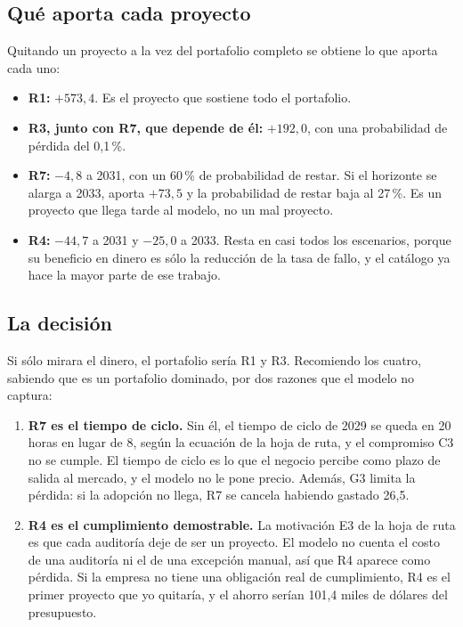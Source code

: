 \documentclass[11pt,letterpaper]{article}
\newcommand{\pct}{\,\%}
\begin{document}
\subsection*{Qué aporta cada proyecto}

Quitando un proyecto a la vez del portafolio completo se obtiene lo que aporta
cada uno:

\begin{itemize}
\item \textbf{R1:} $+573{,}4$. Es el proyecto que sostiene todo el portafolio.
\item \textbf{R3, junto con R7, que depende de él:} $+192{,}0$, con una
  probabilidad de pérdida del 0,1\pct.
\item \textbf{R7:} $-4{,}8$ a 2031, con un 60\pct{} de probabilidad de restar.
  Si el horizonte se alarga a 2033, aporta $+73{,}5$ y la probabilidad de
  restar baja al 27\pct. Es un proyecto que llega tarde al modelo, no un mal
  proyecto.
\item \textbf{R4:} $-44{,}7$ a 2031 y $-25{,}0$ a 2033. Resta en casi todos los
  escenarios, porque su beneficio en dinero es sólo la reducción de la tasa de
  fallo, y el catálogo ya hace la mayor parte de ese trabajo.
\end{itemize}

\subsection*{La decisión}

Si sólo mirara el dinero, el portafolio sería R1 y R3. Recomiendo los cuatro,
sabiendo que es un portafolio dominado, por dos razones que el modelo no
captura:

\begin{enumerate}
\item \textbf{R7 es el tiempo de ciclo.} Sin él, el tiempo de ciclo de 2029 se
  queda en 20 horas en lugar de 8, según la ecuación de la hoja de ruta, y el
  compromiso C3 no se cumple. El tiempo de ciclo es lo que el negocio percibe
  como plazo de salida al mercado, y el modelo no le pone precio. Además, G3
  limita la pérdida: si la adopción no llega, R7 se cancela habiendo gastado
  26,5.
\item \textbf{R4 es el cumplimiento demostrable.} La motivación E3 de la hoja de
  ruta es que cada auditoría deje de ser un proyecto. El modelo no cuenta el
  costo de una auditoría ni el de una excepción manual, así que R4 aparece como
  pérdida. Si la empresa no tiene una obligación real de cumplimiento, R4 es el
  primer proyecto que yo quitaría, y el ahorro serían 101,4 miles de dólares
  del presupuesto.
\end{enumerate}
\end{document}
